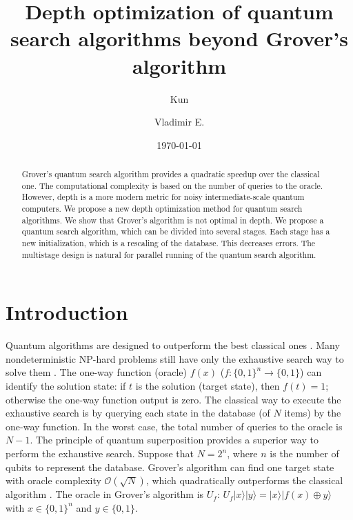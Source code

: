 \documentclass[%
 twocolumn,
 10pt,
 superscriptaddress,
 longbibliography,
 amsmath,amssymb,
 aps,
 pra,
floatfix,
]{revtex4-1}
\begin{document}
\title{Depth optimization of quantum search algorithms beyond Grover's algorithm}%

\author{Kun }
\author{Vladimir  E. }

\date{\today}

\begin{abstract}
	
	Grover's quantum search algorithm provides a quadratic speedup over the classical one. The computational complexity is based on the number of queries to the oracle. However, depth is a more modern metric for noisy intermediate-scale quantum computers. We propose a new depth optimization method for quantum search algorithms. We show that Grover's algorithm is not optimal in depth. We propose a quantum search algorithm, which can be divided into several stages. Each stage has a new initialization, which is a rescaling of the database. This decreases errors. The multistage design is natural for parallel running of the quantum search algorithm. 
	
\end{abstract}

\maketitle

\section{\label{sec:intro}Introduction}

Quantum algorithms are designed to outperform the best classical ones \cite{NC10}. Many nondeterministic NP-hard problems still have only the exhaustive search way to solve them \cite{BBBV96}. The one-way function (oracle) $f(x)$ ($f:\{0,1\}^n\rightarrow \{0,1\}$) can identify the solution state: if $t$ is the solution (target state), then $f(t)=1$; otherwise the one-way function output is zero. The classical way to execute the exhaustive search is by querying each state in the database (of $N$ items) by the one-way function. In the worst case, the total number of queries to the oracle is $N-1$. The principle of quantum superposition provides a superior way to perform the exhaustive search. Suppose that $N=2^n$, where $n$ is the number of qubits to represent the database. Grover's algorithm can find one target state with oracle complexity $\mathcal O(\sqrt N)$, which quadratically outperforms the classical algorithm \cite{Grover97,GK17}. The oracle in Grover's algorithm is $U_f$: $U_f|x\rangle|y\rangle=|x\rangle|f(x)\oplus y\rangle$ with $x\in\{0,1\}^n$ and $y\in\{0,1\}$.
\end{document}
